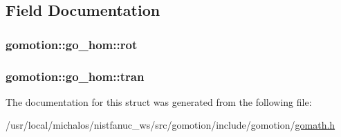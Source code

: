 \subsection{Field Documentation}
\hypertarget{structgomotion_1_1go__hom_aea63ce241414f57e48ef0fd792d576c6}{
\subsubsection[{rot}]{ gomotion\-::go\-\_\-hom\-::rot}}\label{structgomotion_1_1go__hom_aea63ce241414f57e48ef0fd792d576c6}
\hypertarget{structgomotion_1_1go__hom_a48557aa558271478688dd08ead8a643e}{
\subsubsection[{tran}]{ gomotion\-::go\-\_\-hom\-::tran}}\label{structgomotion_1_1go__hom_a48557aa558271478688dd08ead8a643e}


The documentation for this struct was generated from the following file\-:\begin{DoxyCompactItemize}
\item 
/usr/local/michalos/nistfanuc\-\_\-ws/src/gomotion/include/gomotion/\hyperlink{gomath_8h}{gomath.\-h}\end{DoxyCompactItemize}
